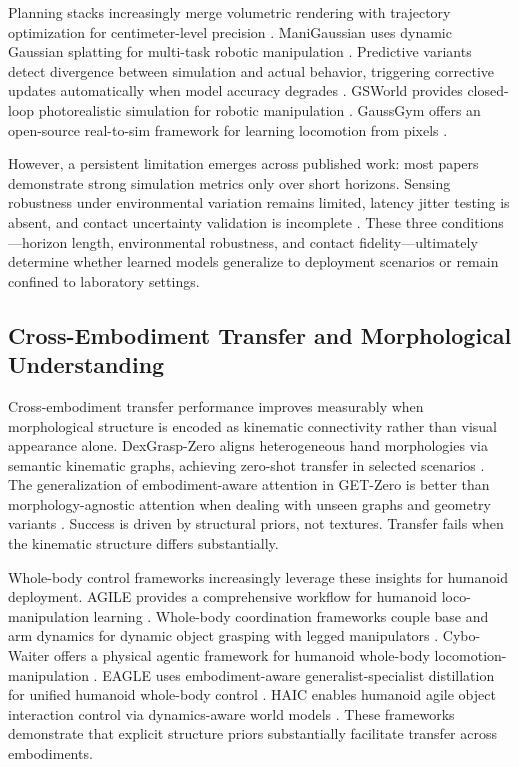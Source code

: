 \documentclass[12pt,a4paper,oneside]{report}
\begin{document}
Planning stacks increasingly merge volumetric rendering with trajectory optimization for centimeter-level precision \cite{sun2026digitaltwin}. ManiGaussian uses dynamic Gaussian splatting for multi-task robotic manipulation \cite{lu2024manigaussian}. Predictive variants detect divergence between simulation and actual behavior, triggering corrective updates automatically when model accuracy degrades \cite{pan2025selfcorrecting}. GSWorld provides closed-loop photorealistic simulation for robotic manipulation \cite{jiang2025gsworld}. GaussGym offers an open-source real-to-sim framework for learning locomotion from pixels \cite{escontrela2025gaussgym}.

However, a persistent limitation emerges across published work: most papers demonstrate strong simulation metrics only over short horizons. Sensing robustness under environmental variation remains limited, latency jitter testing is absent, and contact uncertainty validation is incomplete \cite{lou2024robogs, pan2025selfcorrecting}. These three conditions—horizon length, environmental robustness, and contact fidelity—ultimately determine whether learned models generalize to deployment scenarios or remain confined to laboratory settings.

\subsection{Cross-Embodiment Transfer and Morphological Understanding}
\label{subsec:cross_embodiment_transfer_and_morphological_understanding}

Cross-embodiment transfer performance improves measurably when morphological structure is encoded as kinematic connectivity rather than visual appearance alone. DexGrasp-Zero aligns heterogeneous hand morphologies via semantic kinematic graphs, achieving zero-shot transfer in selected scenarios \cite{wu2025dexgrasp}. The generalization of embodiment-aware attention in GET-Zero is better than morphology-agnostic attention when dealing with unseen graphs and geometry variants \cite{patel2024getzero}. Success is driven by structural priors, not textures. Transfer fails when the kinematic structure differs substantially.

Whole-body control frameworks increasingly leverage these insights for humanoid deployment. AGILE provides a comprehensive workflow for humanoid loco-manipulation learning \cite{zhao2026agile}. Whole-body coordination frameworks couple base and arm dynamics for dynamic object grasping with legged manipulators \cite{liang2025wholebody}. Cybo-Waiter offers a physical agentic framework for humanoid whole-body locomotion-manipulation \cite{ren2026cybowaiter}. EAGLE uses embodiment-aware generalist-specialist distillation for unified humanoid whole-body control \cite{peng2026eagle}. HAIC enables humanoid agile object interaction control via dynamics-aware world models \cite{li2026haic}. These frameworks demonstrate that explicit structure priors substantially facilitate transfer across embodiments.
\end{document}
